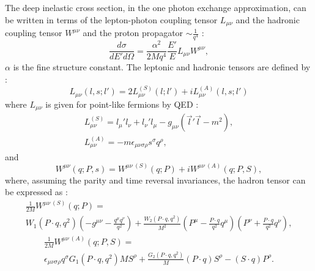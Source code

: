 The deep inelastic cross section, in the one photon exchange approximation, can be written in terms of the lepton-photon coupling tensor $L_{\mu\nu}$ and the hadronic coupling tensor $W^{\mu\nu}$ and the proton propagator $\sim \frac{1}{q^4}$ \cite{AEL} :
%
\begin{equation}
  \frac{d\sigma}{dE'd\Omega} = \frac{\alpha^2}{2Mq^4}\frac{E'}{E}L_{\mu\nu}W^{\mu\nu},
  \label{eq:coupling}
\end{equation}
%
$\alpha$ is the fine structure constant. The leptonic and hadronic tensors are defined by \cite{SchoolFermi} :
%
\begin{equation}
  L_{\mu\nu}(l,s;l') = 2{L^{(S)}_{\mu\nu}(l;l')+iL^{(A)}_{\mu\nu}(l,s;l')}
\end{equation}
%
where $L_{\mu\nu}$ is given for point-like fermions by QED :
%
\begin{equation}
  \begin{split}
    L^{(S)}_{\mu\nu} = l_{\mu}'l_{\nu} + l_{\nu}'l_{\mu} - g_{\mu\nu}(\vec{l}'\vec{l}-m^2), \\
    L^{(A)}_{\mu\nu} = -m\epsilon_{\mu\nu\sigma\rho}s^{\sigma}q^{\rho},
  \end{split}
\end{equation}
%
and
%
\begin{equation}
  W^{\mu\nu}(q;P,s) = W^{\mu\nu\ (S)}(q;P) + iW^{\mu\nu\ (A)}(q;P,S),
\end{equation}
%
where, assuming the parity and time reversal invariances, the hadron tensor can be expressed as :
%
\begin{equation}
  \begin{split}
    \frac{1}{2M}W^{\mu\nu\ (S)}(q;P) = \\
    W_1(P\cdot q,q^2)\left(-g^{\mu\nu}-\frac{q^{\mu}q^{\nu}}{q^2}\right)+\frac{W_2(P\cdot q,q^2)}{M^2}\left(P^{\mu}-\frac{P\cdot q}{q^2}q^{\mu}\right)\left(P^{\nu}+\frac{P\cdot q}{q^2}q^{\nu}\right),
  \end{split}
\end{equation}
%
\begin{equation}
  \begin{split}
    \frac{1}{2M}W^{\mu\nu\ (A)}(q;P,S) = \\
    \epsilon_{\mu\nu\sigma\rho}q^{\sigma}{G_1(P\cdot q,q^2)MS^{\rho}+\frac{G_2(P\cdot q,q^2)}{M}(P\cdot q)S^{\rho}-(S\cdot q)P^{\rho}}.
  \end{split}
\end{equation}

